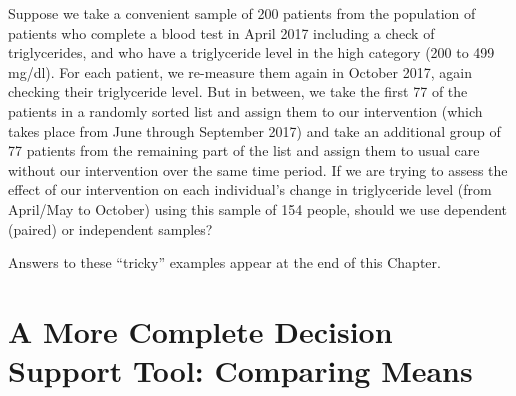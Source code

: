 \documentclass[
]{book}
\begin{document}
\begin{enumerate}
  Suppose we take a convenient sample of 200 patients from the population of patients who complete a blood test in April 2017 including a check of triglycerides, and who have a triglyceride level in the high category (200 to 499 mg/dl). For each patient, we re-measure them again in October 2017, again checking their triglyceride level. But in between, we take the first 77 of the patients in a randomly sorted list and assign them to our intervention (which takes place from June through September 2017) and take an additional group of 77 patients from the remaining part of the list and assign them to usual care without our intervention over the same time period. If we are trying to assess the effect of our intervention on each individual's change in triglyceride level (from April/May to October) using this sample of 154 people, should we use dependent (paired) or independent samples?
\end{enumerate}

Answers to these ``tricky'' examples appear at the end of this Chapter.

\hypertarget{a-more-complete-decision-support-tool-comparing-means}{%
\section{A More Complete Decision Support Tool: Comparing Means}\label{a-more-complete-decision-support-tool-comparing-means}}
\end{document}
